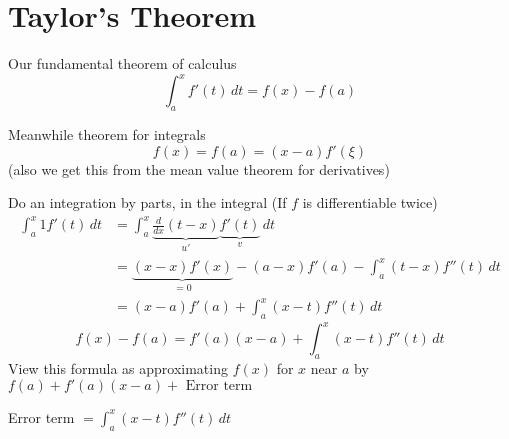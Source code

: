 \chapter{Taylor's Theorem}

\begin{example*}
  Our fundamental theorem of calculus
  \[\int_a^x f'(t)\,dt = f(x) - f(a)\]

  Meanwhile theorem for integrals
  \[f(x) = f(a) = (x-a)f'(\xi)\]
  (also we get this from the mean value theorem for derivatives)

  Do an integration by parts, in the integral (If $f$ is differentiable twice)
  \begin{align*}
    \int_a^x 1 f'(t)\, dt &= \int_a^x \underbrace{\frac{d}{dx}(t-x)}_{u'}\underbrace{f'(t)}_v\, dt \\
    &= \underbrace{(x-x)f'(x)}_{=0} - (a-x)f'(a) - \int_a^x (t-x)f''(t)\, dt \\
    &= (x-a)f'(a) + \int_a^x (x-t)f''(t)\, dt
  \end{align*}
  \[f(x) - f(a) = f'(a)(x-a) + \int_a^x(x-t)f''(t)\, dt\]
  View this formula as approximating $f(x)$ for $x$ near $a$ by $f(a) + f'(a)(x-a) + \text{ Error term}$

  Error term $\displaystyle = \int_a^x (x-t) f''(t)\, dt$
\end{example*}